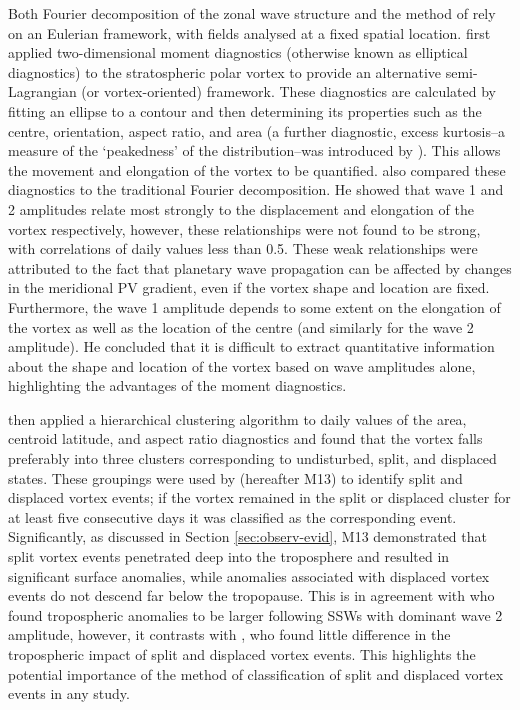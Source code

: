 Both Fourier decomposition of the zonal wave structure and the method of
\citet{Charlton2007} rely on an Eulerian framework, with fields analysed at a
fixed spatial location. \citet{Waugh1997} first applied two-dimensional moment
diagnostics (otherwise known as elliptical diagnostics) to the stratospheric
polar vortex to provide an alternative semi-Lagrangian (or vortex-oriented)
framework. These diagnostics are calculated by fitting an ellipse to a contour
and then determining its properties such as the centre, orientation, aspect
ratio, and area (a further diagnostic, excess kurtosis--a measure of the
`peakedness' of the distribution--was introduced by \citet{Matthewman2009}). This
allows the movement and elongation of the vortex to be
quantified. \citet{Waugh1997} also compared these diagnostics to the traditional
Fourier decomposition. He showed that wave 1 and 2 amplitudes relate most
strongly to the displacement and elongation of the vortex respectively, however,
these relationships were not found to be strong, with correlations of daily
values less than 0.5. These weak relationships were attributed to the fact that
planetary wave propagation can be affected by changes in the meridional PV
gradient, even if the vortex shape and location are fixed. Furthermore, the wave
1 amplitude depends to some extent on the elongation of the vortex as well as
the location of the centre (and similarly for the wave 2 amplitude). He
concluded that it is difficult to extract quantitative information about the
shape and location of the vortex based on wave amplitudes alone, highlighting
the advantages of the moment diagnostics.

\citet{Hannachi2010} then applied a hierarchical clustering algorithm to daily
values of the area, centroid latitude, and aspect ratio diagnostics and found
that the vortex falls preferably into three clusters corresponding to
undisturbed, split, and displaced states. These groupings were used by
\citet{Mitchell2013} (hereafter M13) to identify split and displaced vortex
events; if the vortex remained in the split or displaced cluster for at least
five consecutive days it was classified as the corresponding
event. Significantly, as discussed in Section \ref{sec:observ-evid}, M13
demonstrated that split vortex events penetrated deep into the troposphere and
resulted in significant surface anomalies, while anomalies associated with
displaced vortex events do not descend far below the tropopause. This is in
agreement with \citet{Nakagawa2006} who found tropospheric anomalies to be
larger following SSWs with dominant wave 2 amplitude, however, it contrasts with
\citet{Charlton2007}, who found little difference in the tropospheric impact of
split and displaced vortex events. This highlights the potential importance of
the method of classification of split and displaced vortex events in any study.

